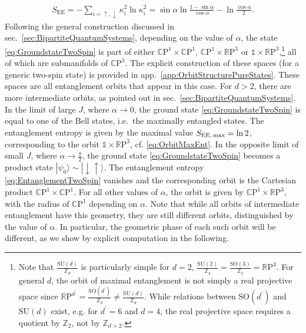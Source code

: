 \documentclass[a4paper,11pt]{article}
\newcommand{\CP}[1]{\mathds{C}\text{P}^{#1}}
\newcommand{\RP}[1]{\mathds{R}\text{P}^{#1}}
\newcommand{\SU}{\text{SU}}
\newcommand{\1}{\mathds{1}}
\newcommand{\p}{{\prime}}
\begin{document}
\begin{align}
    S_{\text{EE}}=-\sum_{i=\uparrow,\downarrow}\kappa_i^2\ln\kappa_i^2=\sin\alpha\ln\frac{1-\sin\alpha}{\cos\alpha}-\ln\frac{\cos\alpha}{2}.\label{eq:EntanglementTwoSpin}
\end{align}
Following the  general construction discussed in sec.~\ref{sec:BipartiteQuantumSystems}, depending on the value of $\alpha$, the state \eqref{eq:GroundstateTwoSpin} is part of either $\CP{1}\times\CP{1}$, $\CP{1}\times\RP{3}$ or $\1\times\RP{3}$,\footnote{Note that $\frac{\SU(d)}{\mathds{Z}_d}$ is particularly simple for $d=2$, $\frac{\SU(2)}{\mathds{Z}_2}=\frac{\text{SO}(3)}{\mathds{Z}_2}=\RP{3}$. For general $d$, the orbit of maximal entanglement is not simply a real projective space since $\RP{d^\p}=\frac{\text{SO}(d^\p)}{\mathds{Z}_2}\neq\frac{\SU(d)}{\mathds{Z}_d}$. While relations between $\text{SO}(d^\p)$ and $\SU(d)$ exist, e.g. for $d^\p=6$ and $d=4$, the real projective space requires a quotient by $\mathds{Z}_2$, not by $\mathds{Z}_{d>2}$.} all of which are submanifolds of $\CP{3}$. The explicit construction of these spaces (for a generic two-spin state) is provided in app.~\ref{app:OrbitStructurePureStates}. These spaces are all entanglement orbits that appear in this case.  For $d>2$, there are more intermediate orbits, as pointed out in sec.~\ref{sec:BipartiteQuantumSystems}. In the limit of large $J$, where $\alpha\to0$, the ground state \eqref{eq:GroundstateTwoSpin} is equal to one of the Bell states, i.e.~the maximally entangled states. The entanglement entropy is given by the maximal value  $S_{\text{EE,\,max}}=\ln2$, corresponding to the orbit $\1\times\RP{3}$, cf. \eqref{eq:OrbitMaxEnt}. In the opposite limit of small $J$, where $\alpha\to\frac{\pi}{2}$, the ground state \eqref{eq:GroundstateTwoSpin} becomes a product state $|\psi_0\rangle\sim|\!\!\downarrow\uparrow\rangle$. The entanglement entropy \eqref{eq:EntanglementTwoSpin} vanishes and the corresponding orbit is the Cartesian product $\CP{1}\times\CP{1}$. For all other values of $\alpha$, the orbit is given by $\CP{1}\times\RP{3}$, with the radius of $\CP{1}$ depending on $\alpha$. Note that while all orbits of intermediate entanglement have this geometry, they are still different orbits, distinguished by the value of $\alpha$. In particular, the geometric phase of each such orbit will be different, as we show by explicit computation in the following.
\end{document}
